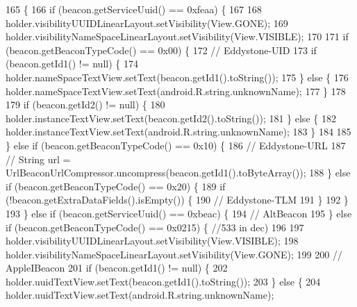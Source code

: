 \begin{DoxyCode}
165                                                                        \{
166         \textcolor{keywordflow}{if} (beacon.getServiceUuid() == 0xfeaa) \{
167 
168             holder.visibilityUUIDLinearLayout.setVisibility(View.GONE);
169             holder.visibilityNameSpaceLinearLayout.setVisibility(View.VISIBLE);
170 
171             \textcolor{keywordflow}{if} (beacon.getBeaconTypeCode() == 0x00) \{
172                 \textcolor{comment}{// Eddystone-UID}
173                 \textcolor{keywordflow}{if} (beacon.getId1() != null) \{
174                     holder.nameSpaceTextView.setText(beacon.getId1().toString());
175                 \} \textcolor{keywordflow}{else} \{
176                     holder.nameSpaceTextView.setText(android.R.string.unknownName);
177                 \}
178 
179                 \textcolor{keywordflow}{if} (beacon.getId2() != null) \{
180                     holder.instanceTextView.setText(beacon.getId2().toString());
181                 \} \textcolor{keywordflow}{else} \{
182                     holder.instanceTextView.setText(android.R.string.unknownName);
183                 \}
184 
185             \} \textcolor{keywordflow}{else} \textcolor{keywordflow}{if} (beacon.getBeaconTypeCode() == 0x10) \{
186                 \textcolor{comment}{// Eddystone-URL}
187                 \textcolor{comment}{// String url = UrlBeaconUrlCompressor.uncompress(beacon.getId1().toByteArray());}
188             \} \textcolor{keywordflow}{else} \textcolor{keywordflow}{if} (beacon.getBeaconTypeCode() == 0x20) \{
189                 \textcolor{keywordflow}{if} (!beacon.getExtraDataFields().isEmpty()) \{
190                     \textcolor{comment}{// Eddystone-TLM}
191                 \}
192             \}
193         \} \textcolor{keywordflow}{else} \textcolor{keywordflow}{if} (beacon.getServiceUuid() == 0xbeac) \{
194             \textcolor{comment}{// AltBeacon}
195         \} \textcolor{keywordflow}{else} \textcolor{keywordflow}{if} (beacon.getBeaconTypeCode() == 0x0215) \{ \textcolor{comment}{//533 in dec)}
196 
197             holder.visibilityUUIDLinearLayout.setVisibility(View.VISIBLE);
198             holder.visibilityNameSpaceLinearLayout.setVisibility(View.GONE);
199 
200             \textcolor{comment}{// AppleIBeacon}
201             \textcolor{keywordflow}{if} (beacon.getId1() != null) \{
202                 holder.uuidTextView.setText(beacon.getId1().toString());
203             \} \textcolor{keywordflow}{else} \{
204                 holder.uuidTextView.setText(android.R.string.unknownName);

\end{DoxyCode}
